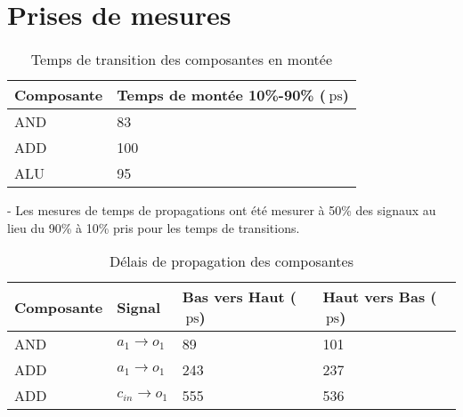 \documentclass[a11paper]{article}
\newcommand{\quicktab}[4]{
  \begin{table}[H]
    \centering
    \caption{#1}
    \label{tab:#2}
    \begin{tabular}{#3}
      #4
    \end{tabular}
  \end{table}
}
\begin{document}
\section{Prises de mesures}

\quicktab{Temps de transition des composantes en montée}{ttLH-Sortie}{ll}{
\toprule
Composante & Temps de montée 10\%-90\% ($\SI{}{\pico\s}$) \\
\midrule
AND & 83 \\
ADD & 100 \\ %
ALU & 95 \\
\bottomrule
}

- Les mesures de temps de propagations ont été mesurer à 50\% des signaux au lieu du 90\% à 10\% pris pour les temps de transitions.

\quicktab{Délais de propagation des composantes}{propagation}{llll}{
\toprule
Composante & Signal & Bas vers Haut ($\SI{}{\pico\s}$) & Haut vers Bas ($\SI{}{\pico\s}$) \\
\midrule
AND & $a_1 \rightarrow o_1$ & 89 & 101 \\
ADD & $a_1 \rightarrow o_1$ & 243 & 237 \\
ADD & $c_{in} \rightarrow o_1$ & 555 & 536 \\
\bottomrule
}




\end{document}
